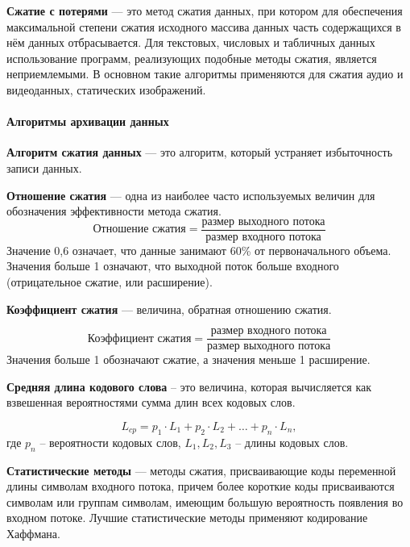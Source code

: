 \textbf{Сжатие с потерями} --- это метод сжатия данных, при котором для
обеспечения максимальной степени сжатия исходного массива данных часть
содержащихся в нём данных отбрасывается. Для текстовых, числовых и табличных
данных использование программ, реализующих подобные методы сжатия, является
неприемлемыми. В основном такие алгоритмы применяются для сжатия аудио и
видеоданных, статических изображений.

\paragraph{Алгоритмы архивации данных}

\textbf{Алгоритм сжатия данных} --- это алгоритм, который устраняет
избыточность записи данных.

\textbf{Отношение сжатия} --- одна из наиболее часто используемых величин для
обозначения эффективности метода сжатия.
\begin{equation}\label{Otnosh_Schatia}
 \text{Отношение сжатия} = \frac{\text{размер
выходного потока}}{\text{размер входного потока}}
\end{equation}
Значение 0,6 означает, что данные занимают 60\% от первоначального объема.
Значения больше 1 означают, что выходной поток больше входного (отрицательное
сжатие, или расширение).

\textbf{Коэффициент сжатия} --- величина, обратная отношению сжатия.

\begin{equation}\label{Otnosh_Schatia}
 \text{Коэффициент сжатия} = \frac{\text{размер входного потока}}{\text{размер
выходного потока}}
\end{equation}
Значения больше 1 обозначают сжатие, а значения меньше 1 расширение.

\textbf{Средняя длина кодового слова} -- это величина, которая вычисляется
как взвешенная вероятностями сумма длин всех кодовых слов.

\begin{equation}
L_{cp}=p_1 \cdot L_1 + p_2 \cdot L_2 +\ldots + p_n \cdot L_n ,
\end{equation}
где $p_n$ -- вероятности кодовых слов,
    $L_1,L_2,L_3$ -- длины кодовых слов.

\textbf{Статистические методы} --- методы сжатия, присваивающие коды
переменной длины символам входного потока, причем более короткие коды
присваиваются символам или группам символам, имеющим большую вероятность
появления во входном потоке. Лучшие статистические методы применяют
кодирование Хаффмана.

